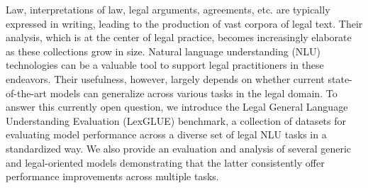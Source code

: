 Law, interpretations of law, legal arguments, agreements, etc. are typically expressed in writing, leading to the production of vast corpora of legal text. Their analysis, which is at the center of legal practice, becomes increasingly elaborate as these collections grow in size. Natural language understanding (NLU) technologies can be a valuable tool to support legal practitioners in these endeavors. Their usefulness, however, largely depends on whether current state-of-the-art models can generalize across various tasks in the legal domain. To answer this currently open question, we introduce the Legal General Language Understanding Evaluation (LexGLUE) benchmark, a collection of datasets for evaluating model performance across a diverse set of legal NLU tasks in a standardized way. We also provide an evaluation and analysis of several generic and legal-oriented models demonstrating that the latter consistently offer performance improvements across multiple tasks.
